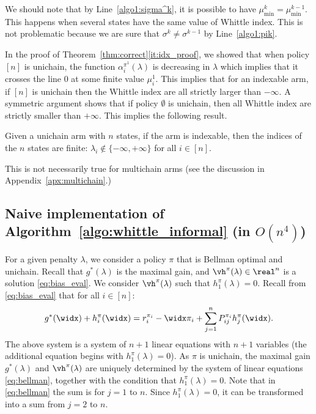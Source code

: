 We should note that by Line~\ref{algo1:sigma^k}, it is possible to have $\mu^k_{\min}=\mu^{k-1}_{\min}$. This happens when several states have the same value of Whittle index. This is not problematic because we are sure that $\sigma^k\neq\sigma^{k-1}$ by Line~\ref{algo1:pik}.

In the proof of Theorem~\ref{thm:correct}\ref{it:idx_proof}, we showed that when policy $[n]$ is unichain, the function $\alpha^{\pi^1}_{i}(\lambda)$ is decreasing in $\lambda$ which implies that it crosses the line $0$ at some finite value $\mu^1_{i}$. This implies that for an indexable arm, if $[n]$ is unichain then the Whittle index are all strictly larger than $-\infty$. A symmetric argument shows that if policy $\emptyset$ is unichain, then all Whittle index are strictly smaller than $+\infty$. This implies the following result. 
\begin{cor}
    Given a unichain arm with $n$ states, if the arm is indexable, then the indices of the $n$ states are finite: $\lambda_i\not\in\{-\infty,+\infty\}$ for all $i\in[n]$.
\end{cor}
This is not necessarily true for multichain arms (see the discussion in Appendix~\ref{apx:multichain}.)

\subsection{Naive implementation of Algorithm~\ref{algo:whittle_informal} \texorpdfstring{(in $O(n^4)$)}{}}
\label{ssec:implem}

For a given penalty $\lambda$, we consider a policy $\pi$ that is Bellman optimal and unichain. Recall that $g^{*}(\lambda)$ is the maximal gain, and $\vh^{\pi}(\lambda)\in\real^n$ is a solution \eqref{eq:bias_eval}.
We consider $\vh^{\pi}(\lambda)$ such that $h^\pi_1(\lambda)=0$.
Recall from \eqref{eq:bias_eval} that for all $i\in[n]:$
\begin{align}
    \label{eq:bellman}
    g^*(\widx) + h^{\pi}_i(\widx) = r_i^{\pi_i} -\widx\pi_i + \sum_{j=1}^nP^{\pi_i}_{ij}h^{\pi}_j(\widx).
\end{align}
The above system is a system of $n+1$ linear equations with $n+1$ variables (the additional equation begins with $h_1^\pi(\lambda)=0$). As $\pi$ is unichain, the maximal gain $g^*(\lambda)$ and $\vh^\pi(\lambda)$ are uniquely determined by the system of linear equations \eqref{eq:bellman}, together with the condition that $h_1^\pi(\lambda)=0$.  Note that in \eqref{eq:bellman} the sum is for $j=1$ to $n$. Since $h_1^\pi(\lambda)=0$, it can be transformed into a sum from $j=2$ to $n$. 

